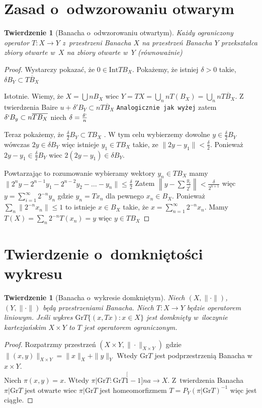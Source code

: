 \documentclass[11pt]{mwrep}
\renewcommand{\[}{\begin{equation}}
\renewcommand{\]}{\end{equation}}
\newcommand{\norm}{\|\cdot\|}
\newcommand{\gr}{\mathrm{Gr}}
\newtheorem{twr}[subsection]{Twierdzenie}%
\begin{document}
\section{Zasad o~odwzorowaniu otwarym}
\begin{twr}[Banacha o~odwzorowaniu otwartym]
	Każdy ograniczony operator $T \colon X \to Y$ z~przestrzeni Banacha $X$ na przestrzeń Banacha $Y$
	przekształca zbiory otwarte w~$X$  na zbiory otwarte w~$Y$ (równoważnie)
\end{twr}
\begin{proof}
	Wystarczy pokazać, że $0 \in \mathrm{Int} TB_X$.
	Pokażemy, że istniej $\delta >0$ takie, $\delta B_Y \subset \overline{TB_{X}}$ \par
	Istotnie. Wiemy, że $X = \bigcup n B_X $ wiec $Y =TX = \bigcup_n n T(B_X) = \bigcup_n n \overline{TB_X}$.
	Z twierdzenia Baire $u + \delta' B_Y \subset n \overline{TB_X}$
	\texttt{Analogicznie jak wyżej}
	zatem $\delta`B_y \subset n \overline{T B_X}$ niech $\delta  = \frac{\delta`}{n}$\par
	Teraz pokażemy, że $\frac{\delta}{2}B_Y \subset TB_X$ .
	W tym celu wybierzemy dowolne $y \in \frac{\delta}{2} B_Y$ wówczas $2y \in \delta B_Y$ więc istnieje $y_1 \in TB_X$ takie, ze 
	$\|2y - y_1 \| < \frac{\delta}{2}$. Ponieważ $2y - y_1 \in \frac{\delta}{2} B_Y$ wiec $2(2y - y_1) \in \delta B_Y$.\par
	Powtarzając to rozumowanie wybieramy wektory $y_n \in TB_X$ mamy 
	$\|2^n y - 2^{n-1}y_{1} - 2^{n-2}y_2 - \ldots -y_n \| \le \frac{\delta}{2}$
	Zatem $\left\| y - \sum \frac{y_i}{2^i}\right\| < \frac{\delta}{2^{n+1}}$ więc 
	$y = \sum_{i=1}^\infty 2^{-n}y_n$ gdzie $y_n = T x_n $ dla pewnego $x_n \in B_X$.
	Ponieważ $\sum_n \|2^{-n} x_n\| \le 1$ to istnieje $x \in B_X$ takie, że $x= \sum_{n=1}^\infty 2^{-n}x_n$. 
	Mamy $T(X) = \sum_n 2^{-n}T(x_n) = y$ więc $y\in TB_X$
\end{proof}
\section{Twierdzenie o~domkniętości wykresu}
\begin{twr}[Banacha o~wykresie domkniętym]
	Niech $(X,\norm)$, $(Y, \norm)$ będą przestrzeniami Banacha. 
	Niech $T\colon X \to Y$ będzie operatorem liniowym. Jeśli wykres $\mathrm{Gr}T\{(x,Tx): x\in X\}$ jest domknięty w~iloczynie kartezjańskim  $X \times Y$ 
	to $T$ jest operatorem ograniczonym.	
\end{twr}
\begin{proof}
	Rozpatrzmy przestrzeń $(X\times Y, \|\cdot\|_{X\times Y})$ gdzie $\|(x,y)\|_{X\times Y} = \|x\|_X + \|y\|_Y$ 
	Wtedy $\gr T$ jest podprzestrzenią Banacha w~$x\times Y$.\\
	Niech $\pi(x,y) = x$. Wtedy $\pi|\gr T\colon \gr T \stackrel[1-1]{na}{\to} X$.
	Z~twierdzenia Banacha $\pi|\gr T$ jest otwarte wiec $\pi |\gr T$ jest homeomorfizmem $T= P_Y (\pi |\gr T)^{-1}$ więc jest ciągłe. 
\end{proof}
\end{document}
